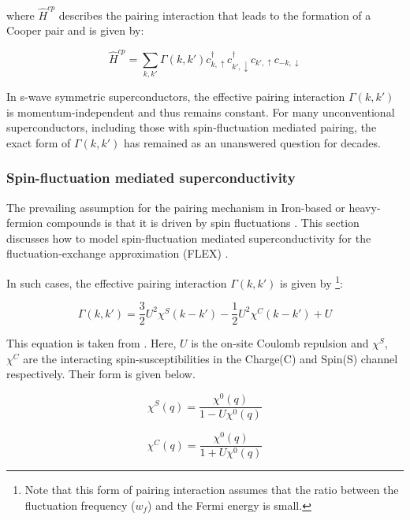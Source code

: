 \documentclass[12pt]{article}
\begin{document}
\noindent where $\hat{H}^{cp}$ describes the pairing interaction that leads to the formation of a Cooper pair and is given by:

\begin{equation}\label{Hcp}
    \hat{H}^{cp} = \sum_{k,k'} \Gamma(k, k') c^{\dagger}_{k, \uparrow}  c^{\dagger}_{k', \downarrow} c_{k', \uparrow}c_{-k, \downarrow}
\end{equation}

\noindent In s-wave symmetric superconductors, the effective pairing interaction $\Gamma(k,k')$ is momentum-independent and thus remains constant. 
For many unconventional superconductors, including those with spin-fluctuation mediated pairing, the exact form of $\Gamma(k,k')$ has remained as an unanswered question for decades. 
\subsubsection{Spin-fluctuation mediated superconductivity}
\label{subsec:spinfluct}

The prevailing assumption for the pairing mechanism in Iron-based or heavy-fermion compounds 
is that it is driven by spin fluctuations \cite{moriya2000spin}. This section discusses how to
model spin-fluctuation mediated superconductivity for the fluctuation-exchange approximation (FLEX) \cite{esirgen1997fluctuation}. \par
\medskip
\noindent In such cases, the effective pairing interaction $\Gamma(k,k')$ is given by \footnote{Note that this form of pairing interaction 
assumes that the ratio between 
the fluctuation frequency ($w_f$) and the Fermi energy is small.}:

\begin{equation}\label{Pairing interaction SF}
    \Gamma(k,k') = \frac{3}{2} U^2 \chi^S(k-k') -\frac{1}{2}U^2 \chi^C(k-k') + U
\end{equation} 

\noindent This equation is taken from \cite{migdal1958interaction}. Here, $U$ is the on-site Coulomb repulsion and $\chi^S$, $\chi^C$ are the interacting spin-susceptibilities in the Charge(C) and Spin(S) channel respectively. Their form is given below.

\begin{equation}
    \chi^S(q) = \frac{\chi^0(q)}{1 - U \chi^0 (q)}
\end{equation}

\begin{equation}
    \chi^C(q) = \frac{\chi^0(q)}{1 + U \chi^0 (q)}
\end{equation}
\end{document}

